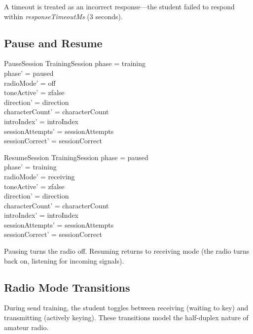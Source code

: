 \documentclass[a4paper,10pt,fleqn]{article}
\begin{document}
A timeout is treated as an incorrect response---the student failed to respond
within \emph{responseTimeoutMs} (3 seconds).

\subsection{Pause and Resume}

\begin{schema}{PauseSession}
\Delta TrainingSession
\where
phase = training \\
phase' = paused \\
radioMode' = off \\
toneActive' = zfalse \\
direction' = direction \\
characterCount' = characterCount \\
introIndex' = introIndex \\
sessionAttempts' = sessionAttempts \\
sessionCorrect' = sessionCorrect
\end{schema}

\begin{schema}{ResumeSession}
\Delta TrainingSession
\where
phase = paused \\
phase' = training \\
radioMode' = receiving \\
toneActive' = zfalse \\
direction' = direction \\
characterCount' = characterCount \\
introIndex' = introIndex \\
sessionAttempts' = sessionAttempts \\
sessionCorrect' = sessionCorrect
\end{schema}

Pausing turns the radio off. Resuming returns to receiving mode (the radio
turns back on, listening for incoming signals).

\subsection{Radio Mode Transitions}

During send training, the student toggles between receiving (waiting to key)
and transmitting (actively keying). These transitions model the half-duplex
nature of amateur radio.
\end{document}
